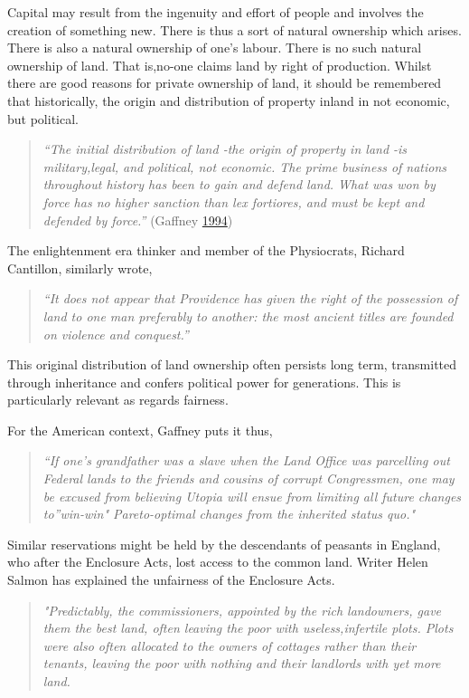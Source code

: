 \documentclass[]{tufte-handout}
\begin{document}
Capital may result from the ingenuity and effort of people and involves
the creation of something new. There is thus a sort of natural ownership
which arises. There is also a natural ownership of one's labour. There
is no such natural ownership of land. That is,no-one claims land by
right of production. Whilst there are good reasons for private ownership
of land, it should be remembered that historically, the origin and
distribution of property inland in not economic, but political.

\begin{quote}
\emph{``The initial distribution of land -the origin of property in land
-is military,legal, and political, not economic. The prime business of
nations throughout history has been to gain and defend land. What was
won by force has no higher sanction than lex fortiores, and must be kept
and defended by force.''} (Gaffney
\protect\hyperlink{ref-Gaffney1994}{1994})
\end{quote}

The enlightenment era thinker and member of the Physiocrats, Richard
Cantillon, similarly wrote,

\begin{quote}
\emph{``It does not appear that Providence has given the right of the
possession of land to one man preferably to another: the most ancient
titles are founded on violence and conquest.''}
\end{quote}

This original distribution of land ownership often persists long term,
transmitted through inheritance and confers political power for
generations. This is particularly relevant as regards fairness.

For the American context, Gaffney puts it thus,

\begin{quote}
\emph{``If one's grandfather was a slave when the Land Office was
parcelling out Federal lands to the friends and cousins of corrupt
Congressmen, one may be excused from believing Utopia will ensue from
limiting all future changes to''win-win" Pareto-optimal changes from the
inherited status quo."}
\end{quote}

Similar reservations might be held by the descendants of peasants in
England, who after the Enclosure Acts, lost access to the common land.
Writer Helen Salmon has explained the unfairness of the Enclosure Acts.

\begin{quote}
\emph{"Predictably, the commissioners, appointed by the rich landowners,
gave them the best land, often leaving the poor with useless,infertile
plots. Plots were also often allocated to the owners of cottages rather
than their tenants, leaving the poor with nothing and their landlords
with yet more land.}
\end{quote}
\end{document}
